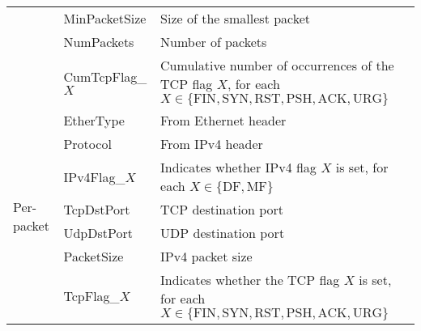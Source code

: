 \begin{table}[t]
\begin{tabular}{|l|l|p{4.2cm}|}
                            & MinPacketSize    & Size of the smallest packet                                                                                                                                                               \\ \cline{2-3} 
                            & NumPackets       & Number of packets                                                                                                                                                                         \\ \cline{2-3} 
                            & CumTcpFlag\_$X$  & Cumulative number of occurrences of the TCP flag $X$, for each $X\in\{\text{FIN}, \text{SYN}, \text{RST}, \text{PSH}, \text{ACK},\text{URG}\}$                                            \\ \hline
\multirow{7}{*}{Per-packet} & EtherType        & From Ethernet header                                                                                                                                                                      \\ \cline{2-3} 
                            & Protocol         & From IPv4 header                                                                                                                                                                          \\ \cline{2-3} 
                            & IPv4Flag\_$X$    & Indicates whether IPv4 flag $X$ is set, for each $X\in\{\text{DF}, \text{MF}\}$                                                                                                           \\ \cline{2-3} 
                            & TcpDstPort       & TCP destination port                                                                                                                                                                      \\ \cline{2-3} 
                            & UdpDstPort       & UDP destination port                                                                                                                                                                      \\ \cline{2-3} 
                            & PacketSize       & IPv4 packet size                                                                                                                                                                          \\ \cline{2-3} 
                            & TcpFlag\_$X$     & Indicates whether the TCP flag $X$ is set, for each $X\in\{\text{FIN}, \text{SYN}, \text{RST}, \text{PSH}, \text{ACK},\text{URG}\}$ 
                                                    \\ \hline
\end{tabular}
\label{tab:feature}
\end{table}





